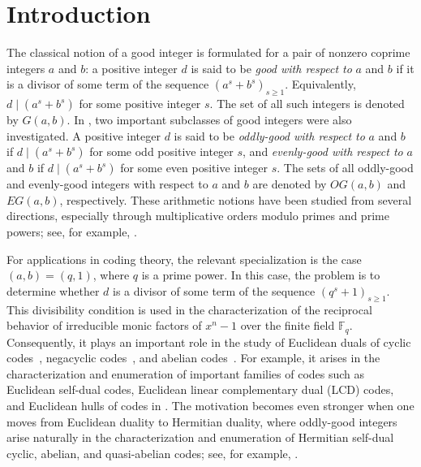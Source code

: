 \documentclass[pdflatex,sn-mathphys-num]{sn-jnl}%
\theoremstyle{thmstyleone}%
\theoremstyle{thmstyletwo}%
\theoremstyle{thmstylethree}%
\newcommand{\F}{\mathbb{F}}
\begin{document}
\section{Introduction} \label{sec1}
The classical notion of a good integer \cite{Moree1997} is formulated for a pair of nonzero coprime integers $a$ and $b$: a positive integer $d$ is said to be \emph{good with respect to} $a$ and $b$ if it is a divisor of some term of the sequence $(a^s+b^s)_{s\ge 1}$. Equivalently, $
d\mid (a^s+b^s)$
for some positive integer $s$.  The set of all such integers is denoted by $G(a,b)$.  In \cite{J2018}, two important subclasses of good integers were also investigated. A positive integer $d$ is said to be \emph{oddly-good with respect to} $a$ and $b$ if $
d\mid (a^s+b^s)$
for some odd positive integer $s$, and \emph{evenly-good with respect to} $a$ and $b$ if $
d\mid (a^s+b^s)$
for some even positive integer $s$.  The sets of all oddly-good and evenly-good integers with respect to $a$ and $b$ are denoted by $OG(a,b)$ and $EG(a,b)$, respectively.
These arithmetic notions have been studied from several directions, especially through multiplicative orders modulo primes and prime powers; see, for example,   \cite{J2018,Jitman2020,Moree1997}. 


For applications in coding theory, the relevant specialization is the case $(a,b)=(q,1)$, where $q$ is a prime power. In this case, the problem is to determine whether $d$ is a divisor of some term of the sequence $(q^s+1)_{s\ge 1}$. This divisibility condition is used in the characterization of the reciprocal behavior of irreducible monic factors of $x^n-1$ over the finite field $\F_q$.  Consequently, it plays an important role in the study of Euclidean duals of cyclic codes~\cite{JLX2011}, negacyclic codes~\cite{Jitman2020}, and abelian codes~\cite{JLLX2013}. For example, it arises in the characterization and enumeration of important families of codes such as Euclidean self-dual codes, Euclidean linear complementary dual (LCD) codes, and Euclidean hulls of codes in  \cite{J2018,JLLX2013,JLX2011}.  The motivation becomes even stronger when one moves from Euclidean duality to Hermitian duality, where oddly-good integers arise naturally in the characterization  and enumeration of Hermitian self-dual cyclic, abelian,  and quasi-abelian codes; see, for example, \cite{BJU2018,J2018,JLS2014}.

 
  
\end{document}

